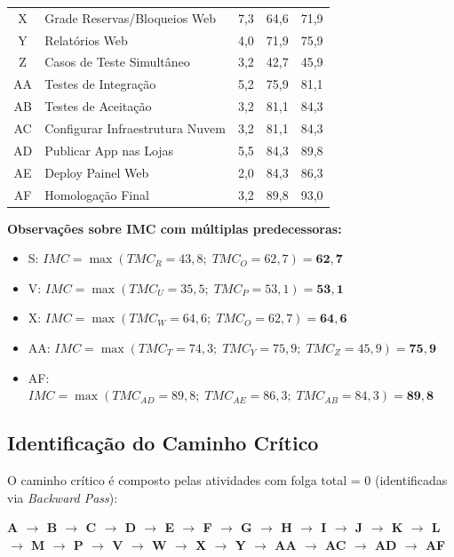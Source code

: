 \documentclass[12pt,a4paper,oneside]{report}
\begin{document}
\begin{longtable}{c p{5.5cm} c c c}
X & Grade Reservas/Bloqueios Web & 7,3 & 64,6 & 71,9 \\
Y & Relatórios Web & 4,0 & 71,9 & 75,9 \\
Z & Casos de Teste Simultâneo & 3,2 & 42,7 & 45,9 \\
AA & Testes de Integração & 5,2 & 75,9 & 81,1 \\
AB & Testes de Aceitação & 3,2 & 81,1 & 84,3 \\
AC & Configurar Infraestrutura Nuvem & 3,2 & 81,1 & 84,3 \\
AD & Publicar App nas Lojas & 5,5 & 84,3 & 89,8 \\
AE & Deploy Painel Web & 2,0 & 84,3 & 86,3 \\
AF & Homologação Final & 3,2 & 89,8 & 93,0 \\
\end{longtable}

\textbf{Observações sobre IMC com múltiplas predecessoras:}
\begin{itemize}
    \item S: $IMC = \max(TMC_R = 43{,}8;\; TMC_O = 62{,}7) = \mathbf{62{,}7}$
    \item V: $IMC = \max(TMC_U = 35{,}5;\; TMC_P = 53{,}1) = \mathbf{53{,}1}$
    \item X: $IMC = \max(TMC_W = 64{,}6;\; TMC_O = 62{,}7) = \mathbf{64{,}6}$
    \item AA: $IMC = \max(TMC_T = 74{,}3;\; TMC_Y = 75{,}9;\; TMC_Z = 45{,}9) = \mathbf{75{,}9}$
    \item AF: $IMC = \max(TMC_{AD} = 89{,}8;\; TMC_{AE} = 86{,}3;\; TMC_{AB} = 84{,}3) = \mathbf{89{,}8}$
\end{itemize}

\subsection{Identificação do Caminho Crítico}

O caminho crítico é composto pelas atividades com folga total = 0 (identificadas via \textit{Backward Pass}):

\begin{center}
\textbf{A $\rightarrow$ B $\rightarrow$ C $\rightarrow$ D $\rightarrow$ E $\rightarrow$ F $\rightarrow$ G $\rightarrow$ H $\rightarrow$ I $\rightarrow$ J $\rightarrow$ K $\rightarrow$ L $\rightarrow$ M $\rightarrow$ P $\rightarrow$ V $\rightarrow$ W $\rightarrow$ X $\rightarrow$ Y $\rightarrow$ AA $\rightarrow$ AC $\rightarrow$ AD $\rightarrow$ AF}
\end{center}
\end{document}
